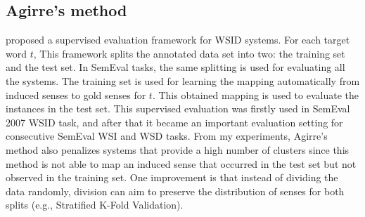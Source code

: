 \subsection{Agirre’s method}
\cite{agirre06evaluating} proposed a supervised evaluation framework for WSID systems. For each target word $t$, This framework splits the annotated data set into two: the training set and the test set. In SemEval tasks, the same splitting is used for evaluating all the systems. The training set is used for learning the mapping automatically from induced senses to gold senses for $t$. This obtained mapping is used to evaluate the instances in the test set. This supervised evaluation was firstly used in SemEval 2007 WSID task, and after that it became an important evaluation setting for consecutive SemEval WSI and WSD tasks. From my experiments, Agirre's method also penalizes systems that provide a high number of clusters since this method is not able to map an induced sense that occurred in the test set but not observed in the training set. One improvement is that instead of dividing the data randomly, division can aim to preserve the distribution of senses for both splits (e.g., Stratified K-Fold Validation).
